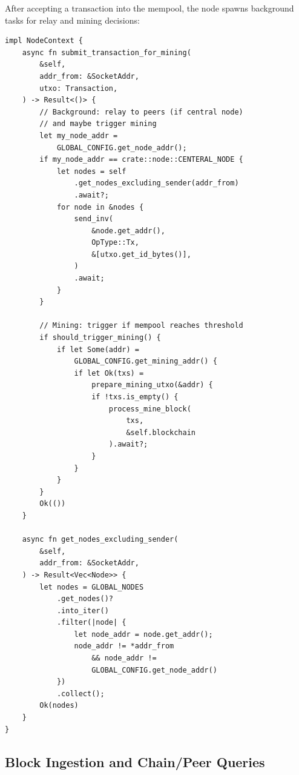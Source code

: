 After accepting a transaction into the mempool, the node spawns background tasks for relay and mining decisions:

\begin{listing}[htbp]
\caption{Background relay and mining submission}
\label{lst:ch13-submit-mining}
\begin{verbatim}
impl NodeContext {
    async fn submit_transaction_for_mining(
        &self,
        addr_from: &SocketAddr,
        utxo: Transaction,
    ) -> Result<()> {
        // Background: relay to peers (if central node)
        // and maybe trigger mining
        let my_node_addr =
            GLOBAL_CONFIG.get_node_addr();
        if my_node_addr == crate::node::CENTERAL_NODE {
            let nodes = self
                .get_nodes_excluding_sender(addr_from)
                .await?;
            for node in &nodes {
                send_inv(
                    &node.get_addr(),
                    OpType::Tx,
                    &[utxo.get_id_bytes()],
                )
                .await;
            }
        }

        // Mining: trigger if mempool reaches threshold
        if should_trigger_mining() {
            if let Some(addr) =
                GLOBAL_CONFIG.get_mining_addr() {
                if let Ok(txs) =
                    prepare_mining_utxo(&addr) {
                    if !txs.is_empty() {
                        process_mine_block(
                            txs,
                            &self.blockchain
                        ).await?;
                    }
                }
            }
        }
        Ok(())
    }

    async fn get_nodes_excluding_sender(
        &self,
        addr_from: &SocketAddr,
    ) -> Result<Vec<Node>> {
        let nodes = GLOBAL_NODES
            .get_nodes()?
            .into_iter()
            .filter(|node| {
                let node_addr = node.get_addr();
                node_addr != *addr_from
                    && node_addr !=
                    GLOBAL_CONFIG.get_node_addr()
            })
            .collect();
        Ok(nodes)
    }
}
\end{verbatim}
\end{listing}

\subsection{Block Ingestion and Chain/Peer Queries}
\label{sec:ch13-block-ingestion}

